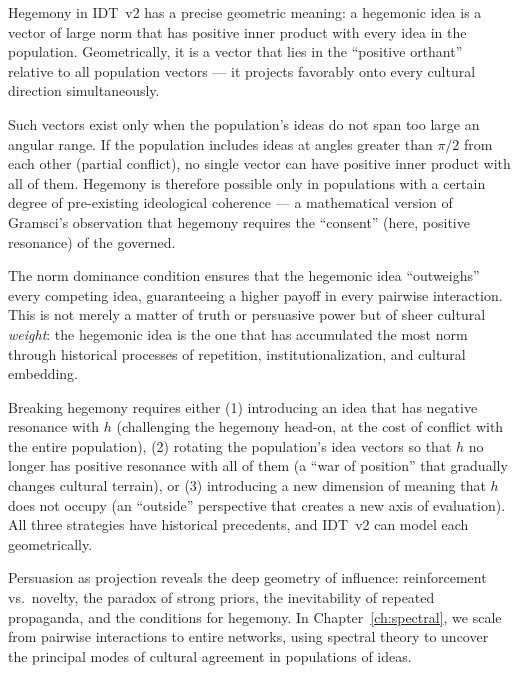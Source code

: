 \begin{interpretation}
\label{interp:hegemony}
Hegemony in IDT~v2 has a precise geometric meaning: a hegemonic idea is a
vector of large norm that has positive inner product with every idea in the
population. Geometrically, it is a vector that lies in the ``positive orthant''
relative to all population vectors --- it projects favorably onto every cultural
direction simultaneously.

Such vectors exist only when the population's ideas do not span too large
an angular range. If the population includes ideas at angles greater than
$\pi/2$ from each other (partial conflict), no single vector can have positive
inner product with all of them. Hegemony is therefore possible only in
populations with a certain degree of pre-existing ideological coherence ---
a mathematical version of Gramsci's observation that hegemony requires the
``consent'' (here, positive resonance) of the governed.

The norm dominance condition ensures that the hegemonic idea ``outweighs'' every
competing idea, guaranteeing a higher payoff in every pairwise interaction.
This is not merely a matter of truth or persuasive power but of sheer cultural
\emph{weight}: the hegemonic idea is the one that has accumulated the most
norm through historical processes of repetition, institutionalization, and
cultural embedding.

Breaking hegemony requires either (1) introducing an idea that has negative
resonance with $h$ (challenging the hegemony head-on, at the cost of conflict
with the entire population), (2) rotating the population's idea vectors so
that $h$ no longer has positive resonance with all of them (a ``war of
position'' that gradually changes cultural terrain), or (3) introducing a new
dimension of meaning that $h$ does not occupy (an ``outside'' perspective that
creates a new axis of evaluation). All three strategies have historical
precedents, and IDT~v2 can model each geometrically.
\end{interpretation}

\bigskip

Persuasion as projection reveals the deep geometry of influence: reinforcement
vs.\ novelty, the paradox of strong priors, the inevitability of repeated
propaganda, and the conditions for hegemony. In Chapter~\ref{ch:spectral}, we
scale from pairwise interactions to entire networks, using spectral theory to
uncover the principal modes of cultural agreement in populations of ideas.

